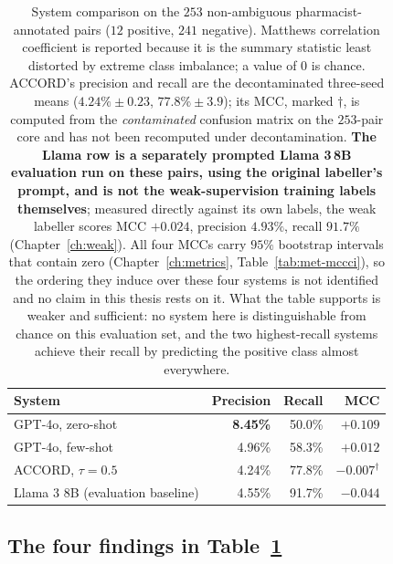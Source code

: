 \begin{table}[t]
\centering
\small
\begin{tabular}{lrrr}
\toprule
\textbf{System} & \textbf{Precision} & \textbf{Recall} & \textbf{MCC} \\
\midrule
GPT-4o, zero-shot        & \textbf{8.45\%} & 50.0\% & $+0.109$ \\
GPT-4o, few-shot         & 4.96\%          & 58.3\% & $+0.012$ \\
ACCORD, $\tau = 0.5$     & 4.24\%          & 77.8\% & $-0.007^{\dagger}$ \\
Llama 3 8B (evaluation baseline) & 4.55\%        & 91.7\% & $-0.044$ \\
\bottomrule
\end{tabular}
\caption{System comparison on the $253$ non-ambiguous pharmacist-annotated
pairs ($12$ positive, $241$ negative). Matthews
correlation coefficient \citep{matthews1975mcc} is reported because it is the
summary statistic least distorted by extreme class imbalance; a value of $0$ is
chance. ACCORD's precision and recall are the decontaminated three-seed means
($4.24\% \pm 0.23$, $77.8\% \pm 3.9$); its MCC, marked $\dagger$, is computed
from the \emph{contaminated} confusion matrix on the $253$-pair core and has not
been recomputed under decontamination. \textbf{The Llama row is a separately
prompted Llama 3\,8B evaluation run on these pairs, using the original
labeller's prompt, and is not the weak-supervision training labels
themselves}; measured directly against its own labels, the weak labeller
scores MCC $+0.024$, precision $4.93\%$, recall $91.7\%$ (Chapter~\ref{ch:weak}).
All four MCCs carry $95\%$ bootstrap
intervals that contain zero (Chapter~\ref{ch:metrics},
Table~\ref{tab:met-mccci}), so the ordering they induce over these four systems
is not identified and no claim in this thesis rests on it. What the table
supports is weaker and sufficient: no system here is distinguishable from chance
on this evaluation set, and the two highest-recall systems achieve their recall
by predicting the positive class almost everywhere.}
\label{tab:systems}
\end{table}

\subsection{The four findings in Table~\ref{tab:systems}}

